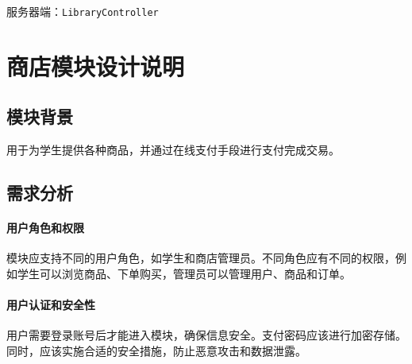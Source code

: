 \documentclass{article}
\begin{document}
\begin{enumerate}
服务器端：\texttt{LibraryController}
    \begin{table}[H]
        \centering
    \end{table}
    


\end{enumerate}

\section{商店模块设计说明}
\subsection{模块背景}
用于为学生提供各种商品，并通过在线支付手段进行支付完成交易。
\subsection{需求分析}

\paragraph{用户角色和权限}
模块应支持不同的用户角色，如学生和商店管理员。不同角色应有不同的权限，例如学生可以浏览商品、下单购买，管理员可以管理用户、商品和订单。

\paragraph{用户认证和安全性}
用户需要登录账号后才能进入模块，确保信息安全。支付密码应该进行加密存储。同时，应该实施合适的安全措施，防止恶意攻击和数据泄露。
\end{document}
